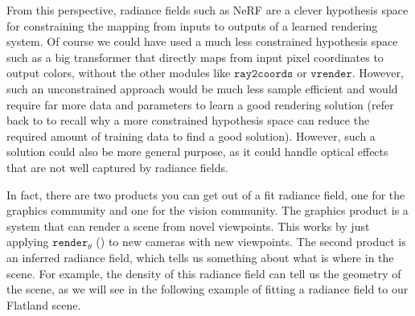 From this perspective, radiance fields such as NeRF are a clever hypothesis space for constraining the mapping from inputs to outputs of a learned rendering system. 
Of course we could have used a much less constrained hypothesis space such as a big transformer that directly maps from input pixel coordinates to output colors, 
without the other modules like $\texttt{ray2coords}$ or $\texttt{vrender}$. However, such an unconstrained approach would be much less sample efficient and would require 
far more data and parameters to learn a good rendering solution (refer back to \chap{\ref{chapter:problem_of_generalization}} to recall why a more constrained hypothesis 
space can reduce the required amount of training data to find a good solution). However, such a solution could also be more general purpose, 
as it could handle optical effects that are not well captured by radiance fields.

In fact, there are two products you can get out of a fit radiance field, one for the graphics community and one for the vision community. 
The graphics product is a system that can render a scene from novel viewpoints. 
This works by just applying $\texttt{render}_{\theta}$ (\fig{\ref{fig:nerfs:full_nerf_pipeline}}) to new cameras with new viewpoints. 
The second product is an inferred radiance field, which tells us something about what is where in the scene. For example, 
the density of this radiance field can tell us the geometry of the scene, as we will see in the following example of fitting a radiance field to our Flatland scene.

